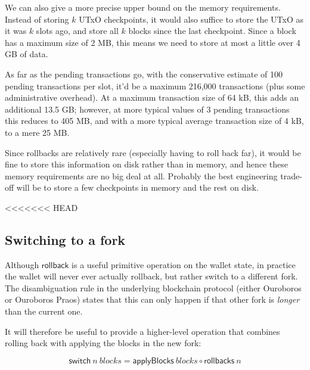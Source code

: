 \documentclass{article}
\theoremstyle{definition}{
  \newtheorem{lemma}{Lemma}[section] %
  \newtheorem{definition}[lemma]{Definition}
}
\theoremstyle{theorem}{
  \newtheorem{invariant}[lemma]{Invariant}
  \newtheorem{proofobligation}[lemma]{Proof Obligation}
}
\numberwithin{equation}{lemma}
\begin{document}

We can also give a more precise upper bound on the memory requirements. Instead
of storing $k$ UTxO checkpoints, it would also suffice to store the UTxO as it
was $k$ slots ago, and store all $k$ blocks since the last checkpoint. Since a
block has a maximum size of 2 MB, this means we need to store at most a little
over 4 GB of data.

As far as the pending transactions go, with the conservative estimate of 100
pending transactions per slot, it'd be a maximum 216,000 transactions (plus some
administrative overhead). At a maximum transaction size of 64 kB, this adds an
additional 13.5 GB; however, at more typical values of 3 pending transactions
this reduces to 405 MB, and with a more typical average transaction size of 4
kB, to a mere 25 MB.

Since rollbacks are relatively rare (especially having to roll back far), it
would be fine to store this information on disk rather than in memory, and hence
these memory requirements are no big deal at all. Probably the best engineering
trade-off will be to store a few checkpoints in memory and the rest on disk.


<<<<<<< HEAD
\subsection{Switching to a fork}

Although $\mathsf{rollback}$ is a useful primitive operation on the wallet
state, in practice the wallet will never ever actually rollback, but rather
switch to a different fork. The disambiguation rule in the underlying blockchain
protocol (either Ouroboros or Ouroboros Praos) states that this can only happen
if that other fork is \emph{longer} than the current one.

It will therefore be useful to provide a higher-level operation that combines
rolling back with applying the blocks in the new fork:

\begin{equation}
\mathsf{switch} ~ n ~ \mathit{blocks} = \mathsf{applyBlocks} ~ \mathit{blocks} \circ \mathsf{rollbacks} ~ n
\end{equation}
\end{document}
